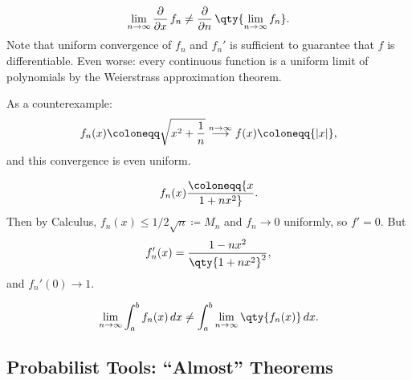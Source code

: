 \begin{proposition}

\begin{align*}  
\lim_{n\to \infty} {\frac{\partial }{\partial x}\,} f_n \neq {\frac{\partial }{\partial n}\,} \qty{\lim_{n\to \infty} f_n}
.\end{align*}
Note that uniform convergence of \(f_n\) and \(f_n'\) is sufficient to
guarantee that \(f\) is differentiable. Even worse: every continuous
function is a uniform limit of polynomials by the Weierstrass
approximation theorem.

\end{proposition}

\begin{example}[?]

As a counterexample:
\begin{align*}
f_n(x) \coloneqq\sqrt{x^2 + {1\over n}} \overset{n\to\infty}\longrightarrow f(x) \coloneqq{\left\lvert {x} \right\rvert}
,\end{align*}
and this convergence is even uniform.

\end{example}

\begin{example}[?]

\begin{align*}
f_n(x) \coloneqq{x\over 1 + nx^2}
.\end{align*}
Then by Calculus, \(f_n(x) \leq 1/2\sqrt{n} \coloneqq M_n\) and
\(f_n\to 0\) uniformly, so \(f' = 0\). But
\begin{align*}
f_n'(x) = {1-nx^2 \over\qty{1 + nx^2}^2}
,\end{align*}
and \(f_n'(0) \to 1\).

\end{example}

\begin{proposition}[?]

\begin{align*}  
\lim_{n\to \infty} \int_a^b f_n(x) \,dx \neq \int_a^b \lim_{n\to \infty} \qty{ f_n(x) } \,dx
.\end{align*}

\end{proposition}

\hypertarget{probabilist-tools-almost-theorems}{%
\subsection{Probabilist Tools: ``Almost''
Theorems}\label{probabilist-tools-almost-theorems}}

